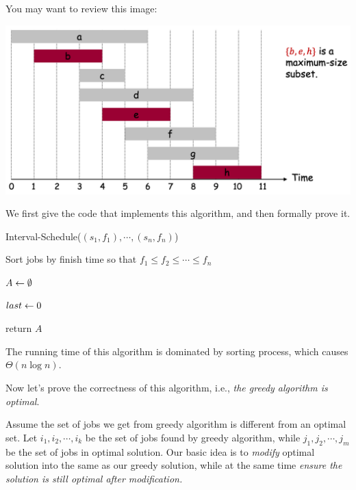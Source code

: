 \begin{spacing}{1.3}
    You may want to review this image:
    \begin{center}
        \includegraphics[scale=0.35]{images/07-interval-example.png}
    \end{center}
    We first give the code that implements this algorithm, and then formally prove it.
    
    \begin{algorithm*}
        \caption{Interval-Schedule($(s_1,f_1), \cdots, (s_n, f_n)$)}
        Sort jobs by finish time so that $f_1\le f_2\le \cdots \le f_n$

        $A\leftarrow \emptyset$ \qquad {}

        $last \leftarrow 0$   \qquad {}

        return $A$
    \end{algorithm*}

    The running time of this algorithm is dominated by sorting process, which causes $\Theta(n\log n)$.

    Now let's prove the correctness of this algorithm, i.e., {\it the greedy algorithm is optimal}.

    Assume the set of jobs we get from greedy algorithm is different from an optimal set.
    Let $i_1,i_2,\cdots, i_k$ be the set of jobs found by greedy algorithm, while 
    $j_1,j_2,\cdots,j_m$ be the set of jobs in optimal solution. Our basic idea is to 
    {\it modify} optimal solution into the same as our greedy solution, while at the same time 
    {\it ensure the solution is still optimal after modification.}


\end{spacing}
